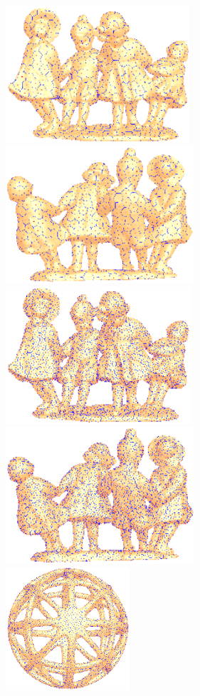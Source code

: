 \begin{figure}[htbp]
\centering
\includegraphics[height=2in]{figs/cvt/g8_4_nf400k_1k_front_1.png}
\includegraphics[height=2in]{figs/cvt/g8_4_nf400k_1k_back_1.png}\\
\includegraphics[height=2in]{figs/cvt/g8_4_nf400k_4k_front_1.png}
\includegraphics[height=2in]{figs/cvt/g8_4_nf400k_4k_back_1.png}\\
\includegraphics[height=1.8in]{figs/cvt/lp_esher1_nf480k_seed_4k.png}

\end{figure}
